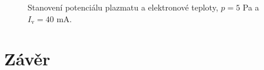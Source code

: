 \documentclass[a4paper,12pt]{article}
\begin{document}
\begin{figure}[h]
	\centering
	\begin{subfigure}[b]{.49\textwidth}
		\centering
	\end{subfigure}
	\begin{subfigure}[b]{.49\textwidth}
		\centering
	\end{subfigure}
	\caption{Stanovení potenciálu plazmatu a elektronové teploty, $p = 5$ \si{\pascal} a $I_\text{v} = 40$ \si{\milli\ampere}.}
	\label{data7}
\end{figure}
\section{Závěr}

\end{document}
